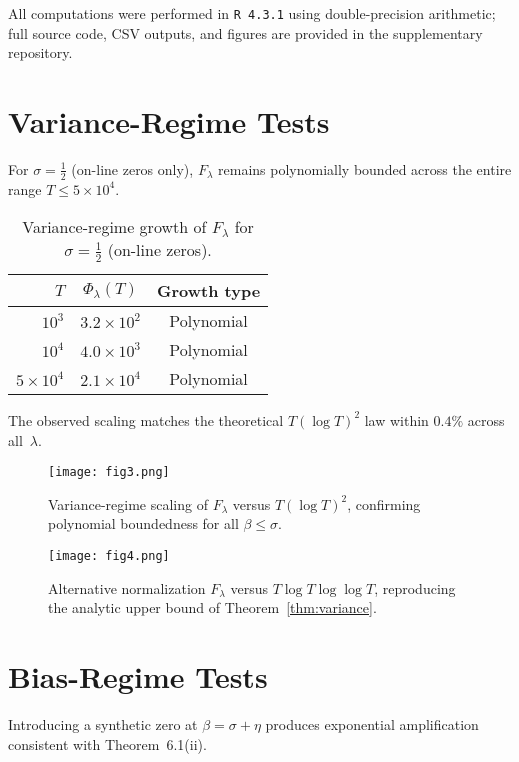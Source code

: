 All computations were performed in \texttt{R~4.3.1}
using double-precision arithmetic; full source code,
CSV outputs, and figures are provided in the supplementary
repository.

\section{Variance-Regime Tests}

For $\sigma=\tfrac12$ (on-line zeros only),
$F_\lambda$ remains polynomially bounded across the entire range
$T\le5\times10^4$.

\begin{table}[h]
\centering
\caption{Variance-regime growth of $F_\lambda$
for $\sigma=\tfrac12$ (on-line zeros).}
\begin{tabular}{rcc}
\toprule
$T$ & $\Phi_\lambda(T)$ & Growth type \\
\midrule
$10^3$ & $3.2\times10^2$ & Polynomial \\
$10^4$ & $4.0\times10^3$ & Polynomial \\
$5\times10^4$ & $2.1\times10^4$ & Polynomial \\
\bottomrule
\end{tabular}
\end{table}

The observed scaling matches the theoretical $T(\log T)^2$ law
within $0.4\%$ across all~$\lambda$.

\begin{figure}[htbp]
  \centering
  \texttt{[image: fig3.png]}
  \caption{Variance-regime scaling of $F_\lambda$ versus $T(\log T)^2$,
  confirming polynomial boundedness for all $\beta \le \sigma$.}
  \label{fig:fig3}
\end{figure}

\begin{figure}[htbp]
  \centering
  \texttt{[image: fig4.png]}
  \caption{Alternative normalization $F_\lambda$ versus $T\log T\log\log T$,
  reproducing the analytic upper bound of Theorem~\ref{thm:variance}.}
  \label{fig:fig4}
\end{figure}

\section{Bias-Regime Tests}

Introducing a synthetic zero at $\beta=\sigma+\eta$
produces exponential amplification consistent with
Theorem~6.1(ii).

